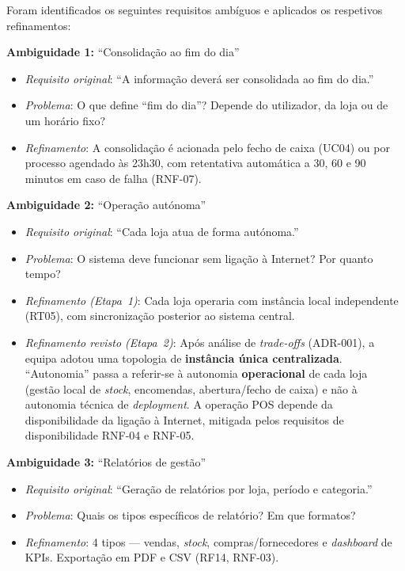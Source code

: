     Foram identificados os seguintes requisitos ambíguos e aplicados os respetivos refinamentos:

    \textbf{Ambiguidade 1:} ``Consolidação ao fim do dia''
    \begin{itemize}
        \item \textit{Requisito original}: ``A informação deverá ser consolidada ao fim do dia.''
        \item \textit{Problema}: O que define ``fim do dia''? Depende do utilizador, da loja ou de um horário fixo?
        \item \textit{Refinamento}: A consolidação é acionada pelo fecho de caixa (UC04) ou por processo agendado às 23h30, com retentativa automática a 30, 60 e 90 minutos em caso de falha (RNF-07).
    \end{itemize}

    \textbf{Ambiguidade 2:} ``Operação autónoma''
    \begin{itemize}
        \item \textit{Requisito original}: ``Cada loja atua de forma autónoma.''
        \item \textit{Problema}: O sistema deve funcionar sem ligação à Internet? Por quanto tempo?
        \item \textit{Refinamento (Etapa~1)}: Cada loja operaria com instância local independente (RT05), com sincronização posterior ao sistema central.
        \item \textit{Refinamento revisto (Etapa~2)}: Após análise de \textit{trade-offs} (ADR-001), a equipa adotou uma topologia de \textbf{instância única centralizada}. ``Autonomia'' passa a referir-se à autonomia \textbf{operacional} de cada loja (gestão local de \textit{stock}, encomendas, abertura/fecho de caixa) e não à autonomia técnica de \textit{deployment}. A operação POS depende da disponibilidade da ligação à Internet, mitigada pelos requisitos de disponibilidade RNF-04 e RNF-05.
    \end{itemize}

    \textbf{Ambiguidade 3:} ``Relatórios de gestão''
    \begin{itemize}
        \item \textit{Requisito original}: ``Geração de relatórios por loja, período e categoria.''
        \item \textit{Problema}: Quais os tipos específicos de relatório? Em que formatos?
        \item \textit{Refinamento}: 4 tipos --- vendas, \textit{stock}, compras/fornecedores e \textit{dashboard} de KPIs. Exportação em PDF e CSV (RF14, RNF-03).
    \end{itemize}

